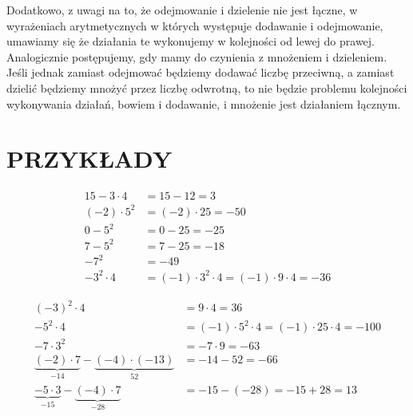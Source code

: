\documentclass[10pt]{article}
\begin{document}
Dodatkowo, z uwagi na to, że odejmowanie i dzielenie nie jest łączne, w wyrażeniach arytmetycznych w których występuje dodawanie i odejmowanie, umawiamy się że działania te wykonujemy w kolejności od lewej do prawej. Analogicznie postępujemy, gdy mamy do czynienia z mnożeniem i dzieleniem.\\
Jeśli jednak zamiast odejmować będziemy dodawać liczbę przeciwną, a zamiast dzielić będziemy mnożyć przez liczbę odwrotną, to nie będzie problemu kolejności wykonywania działań, bowiem i dodawanie, i mnożenie jest działaniem łącznym.

\section*{PRZYKŁADY}
\[
\begin{aligned}
15-3 \cdot 4 & =15-12=3 \\
(-2) \cdot 5^{2} & =(-2) \cdot 25=-50 \\
0-5^{2} & =0-25=-25 \\
7-5^{2} & =7-25=-18 \\
-7^{2} & =-49 \\
-3^{2} \cdot 4 & =(-1) \cdot 3^{2} \cdot 4=(-1) \cdot 9 \cdot 4=-36
\end{aligned}
\]

\[
\begin{aligned}
(-3)^{2} \cdot 4 & =9 \cdot 4=36 \\
-5^{2} \cdot 4 & =(-1) \cdot 5^{2} \cdot 4=(-1) \cdot 25 \cdot 4=-100 \\
-7 \cdot 3^{2} & =-7 \cdot 9=-63 \\
\underbrace{(-2) \cdot 7}_{-14}-\underbrace{(-4) \cdot(-13)}_{52} & =-14-52=-66 \\
\underbrace{-5 \cdot 3}_{-15}-\underbrace{(-4) \cdot 7}_{-28} & =-15-(-28)=-15+28=13
\end{aligned}
\]
\end{document}
